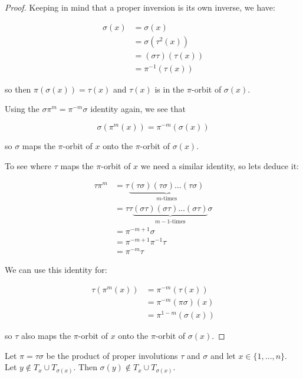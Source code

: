 \begin{proof}

Keeping in mind that a proper inversion is its own inverse, we have:

\begin{align*}
\sigma(x) &= \sigma(x) \\
        &= \sigma(\tau^2(x)) \\
        &= (\sigma \tau) (\tau(x)) \\
        &= \pi^{-1} (\tau(x))
\end{align*}

so then $\pi(\sigma(x)) = \tau(x)$ and $\tau(x)$ is in the $\pi$-orbit of $\sigma(x)$.

Using the $\sigma \pi^m = \pi^{-m} \sigma$ identity again, we see that

$$
\sigma (\pi^m (x)) = \pi^{-m}(\sigma(x))
$$

so $\sigma$ maps the $\pi$-orbit of $x$ onto the $\pi$-orbit of $\sigma(x)$. 

To see where $\tau$ maps the $\pi$-orbit of $x$ we need a similar identity, so lets deduce it:

\begin{align*}
\tau \pi^m &= \tau \underbrace{(\tau\sigma) (\tau\sigma) \ldots (\tau\sigma)}_{m\text{-times}} \\
           &= \tau \tau \underbrace{(\sigma\tau) (\sigma\tau) \ldots (\sigma\tau)}_{m-1\text{-times}} \sigma \\
           &= \pi^{-m+1} \sigma \\
           &= \pi^{-m+1} \pi^{-1} \tau \\
           &= \pi^{-m} \tau
\end{align*}


We can use this identity for:

\begin{align*}
\tau(\pi^m(x)) &= \pi^{-m}(\tau(x)) \\
               &= \pi^{-m}(\pi\sigma)(x) \\
               &= \pi^{1-m} (\sigma(x)) 
\end{align*}

so $\tau$ also maps the $\pi$-orbit of $x$ onto the $\pi$-orbit of $\sigma(x)$. 

\end{proof}

\begin{thm}\label{involutionproduct3}
Let $\pi = \tau \sigma$ be the product of proper involutions $\tau$ and $\sigma$ and let $x \in \{1, \ldots, n\}$. Let $y \notin T_x \cup T_{\sigma(x)}$. Then $\sigma(y) \notin T_x \cup T_{\sigma(x)}$.
\end{thm}

